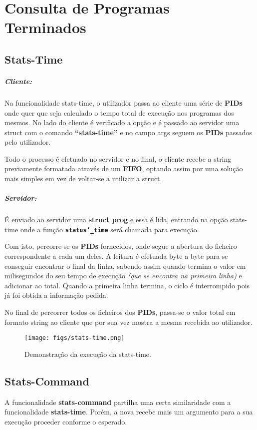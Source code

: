 \documentclass[11.5pt,a4paper]{report}
\begin{document}
\section{Consulta de Programas Terminados}

\subsection{Stats-Time}
\subparagraph{Cliente:} Na funcionalidade stats-time, o utilizador passa ao cliente uma série de \textbf{PIDs} onde quer que seja calculado o tempo total de execução nos programas dos mesmos.
No lado do cliente é verificado a opção e é passado ao servidor uma struct com o comando \textbf{“stats-time”} e no campo args seguem os \textbf{PIDs} passados pelo utilizador.\par
Todo o processo é efetuado no servidor e no final, o cliente recebe a string previamente formatada através de um \textbf{FIFO}, optando assim por uma solução mais simples em vez de voltar-se a utilizar a struct.

\subparagraph{Servidor:} É enviado ao servidor uma \textbf{struct prog} e essa é lida, entrando na opção stats-time onde a função \textbf{\texttt{status\char`_time}} será chamada para execução. \par
Com isto, percorre-se os \textbf{PIDs} fornecidos, onde segue a abertura do ficheiro correspondente a cada um deles. A leitura é efetuada byte a byte para se conseguir encontrar o final da linha, sabendo assim quando termina o valor em milisegundos do seu tempo de execução \textit{(que se encontra na primeira linha)} e adicionar ao total. Quando a primeira linha termina, o ciclo é interrompido pois já foi obtida a informação pedida.\par
No final de percorrer todos os ficheiros dos \textbf{PIDs}, passa-se o valor total em formato string ao cliente que por sua vez mostra a mesma recebida ao utilizador.

\begin{figure}[h]
    \centering
    \texttt{[image: figs/stats-time.png]}
    \caption{Demonstração da execução da stats-time.}
    \label{f}
\end{figure}

\subsection{Stats-Command}
A funcionalidade \textbf{stats-command} partilha uma certa similaridade com a funcionalidade \textbf{stats-time}. Porém, a nova recebe mais um argumento para a sua execução proceder conforme o esperado.
\end{document}
